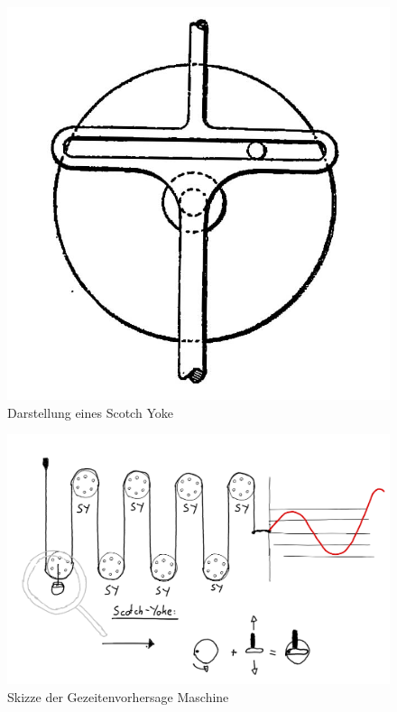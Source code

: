 \begin{figure}
	\centering
	\includegraphics[width=\linewidth]{"papers/gezeiten/Scotch Yoke"}
	\caption{Darstellung eines Scotch Yoke}
	\label{fig:scotch-yoke}
\end{figure}

\begin{figure}
	\centering
	\includegraphics[width=\linewidth]{"papers/gezeiten/Skizze Maschine"}
	\caption{Skizze der Gezeitenvorhersage Maschine}
	\label{fig:skizze-maschine}
\end{figure}

